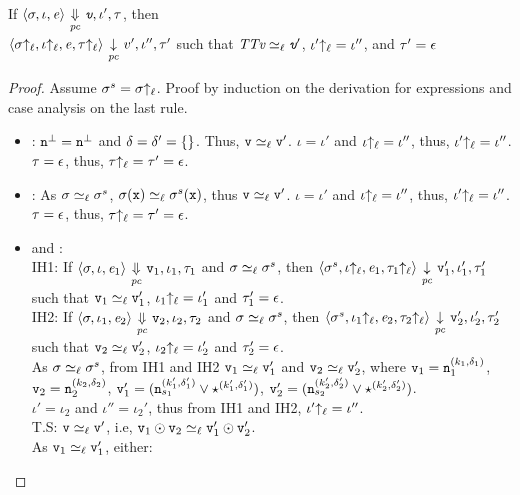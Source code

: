 \begin{myLemma}
\label{lem:app:lir:simExp}
If 
$\langle \sigma, \iota, \mathit{e} \rangle
{~\underset{\mathit{pc}}{\Downarrow}~} \emph{\texttt{v}}, \iota', \tau $, then\\
$\langle \sigma{\uparrow_\ell}, \iota{\uparrow_\ell}, \mathit{e}, \tau{\uparrow_\ell} \rangle {~\underset{\mathit{pc}}{\downarrow}~} 
v', \iota'', \tau' $ such that 
$\emph{TT{v}} \simeq_\ell \emph{\texttt{v}}'$, $\iota'{\uparrow_\ell} = \iota''$, and $\tau' = \epsilon$
\end{myLemma}
\begin{proof}
  Assume $\sigma^s = \sigma{\uparrow_\ell}$. 
  Proof by induction on the derivation for expressions and case
  analysis on the last rule.
  \begin{itemize}[leftmargin=.5in]
  \item{}: $\texttt{n}^{\bot} = \texttt{n}^{\bot}$ and $\delta = \delta' = \{\}$. Thus,
    $\texttt{v} \simeq_\ell \texttt{v}'$. $\iota = \iota'$ and $\iota{\uparrow_\ell} =
    \iota''$, thus, $\iota'{\uparrow_\ell} = \iota''$. $\tau = \epsilon$,
    thus, $\tau{\uparrow_\ell} = \tau' = \epsilon$. 

  \item{}: As $\sigma \simeq_\ell \sigma^s$, $\sigma(\texttt{x})
    \simeq_\ell \sigma^s(\texttt{x})$, thus $\texttt{v} \simeq_\ell \texttt{v}'$. $\iota
    = \iota'$ and $\iota{\uparrow_\ell} = \iota''$, thus, $\iota'{\uparrow_\ell} =
    \iota''$. $\tau = \epsilon$, thus, $\tau{\uparrow_\ell} = \tau' =
    \epsilon$.   

  \item{} and :\\
    IH1: If $\langle \sigma, \iota, \mathit{e}_1 \rangle
    {~\underset{\mathit{pc}}{\Downarrow}~} \texttt{v}_1, \iota_1, \tau_1 $ and $\sigma 
    \simeq_\ell \sigma^s$, then $\langle \sigma^s, \iota{\uparrow_\ell},
    \mathit{e}_1, \tau_1{\uparrow_\ell} \rangle {~\underset{\mathit{pc}}{\downarrow}~} \texttt{v}_1',
    \iota_1', \tau_1' $ such that $\texttt{v}_1 \simeq_\ell \texttt{v}_1'$,
    $\iota_1{\uparrow_\ell} = \iota_1'$ and $\tau_1' = \epsilon$. \\
    IH2: If $\langle \sigma, \iota_1, \mathit{e}_2 \rangle
    {~\underset{\mathit{pc}}{\Downarrow}~} \texttt{v}_2, \iota_2, \tau_2 $ and $\sigma
    \simeq_\ell \sigma^s$, then $\langle \sigma^s, \iota_1{\uparrow_\ell},
    \mathit{e}_2, \tau_2{\uparrow_\ell} \rangle {~\underset{\mathit{pc}}{\downarrow}~} \texttt{v}_2', 
    \iota_2', \tau_2' $ such that $\texttt{v}_2 \simeq_\ell \texttt{v}_2'$,
    $\iota_2{\uparrow_\ell} = \iota_2'$ and $\tau_2' = \epsilon$. \\
    As $\sigma \simeq_\ell \sigma^s$, from IH1 and IH2 $\texttt{v}_1
    \simeq_\ell \texttt{v}_1'$ and $\texttt{v}_2 \simeq_\ell \texttt{v}_2'$, where $\texttt{v}_1 =
    \texttt{n}_1^{(k_1, \delta_1)}$, $\texttt{v}_2 = \texttt{n}_2^{(k_2, \delta_2)}$, $\texttt{v}_1' =
    (\texttt{n}_{s_1}^{(k_1',\delta_1')} \vee \star^{(k_1', \delta_1')})$, $\texttt{v}_2' =
    (\texttt{n}_{s_2}^{(k_2',\delta_2')} \vee \star^{(k_2', \delta_2')})$. \\ $\iota' =
    \iota_2$ and $\iota'' = \iota_2'$, thus from IH1 and IH2, $\iota'{\uparrow_\ell} =
    \iota''$. \\ 
    T.S: $\texttt{v} \simeq_\ell \texttt{v}'$, i.e, $\texttt{v}_1 \odot \texttt{v}_2 \simeq_\ell
    \texttt{v}_1' \odot \texttt{v}_2'$.\\
    As $\texttt{v}_1 \simeq_\ell \texttt{v}_1'$, either:


\end{itemize}
\end{proof}
